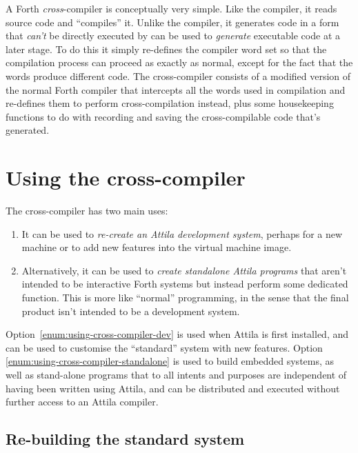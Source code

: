 A Forth \emph{cross}-compiler is conceptually very simple. Like the
compiler, it reads source code and ``compiles'' it. Unlike the
compiler, it generates code in a form that \emph{can't} be directly
executed by can be used to \emph{generate} executable code at a later
stage. To do this it simply re-defines the compiler word set so that
the compilation process can proceed as exactly as normal, except for
the fact that the words produce different code. The cross-compiler
consists of a modified version of the normal Forth compiler that
intercepts all the words used in compilation and re-defines them to
perform cross-compilation instead, plus some housekeeping functions to
do with recording and saving the cross-compilable code that's generated. 


\section{Using the cross-compiler}
\label{sec:using-cross-compiler}

The cross-compiler has two main uses:

\begin{enumerate}
\item\label{enum:using-cross-compiler-dev} It can be used to
  \emph{re-create an Attila development system}, perhaps for a new
  machine or to add new features into the virtual machine image.
\item\label{enum:using-cross-compiler-standalone} Alternatively, it
  can be used to \emph{create standalone Attila programs} that aren't
  intended to be interactive Forth systems but instead perform some
  dedicated function. This is more like ``normal'' programming, in the
  sense that the final product isn't intended to be a development
  system.
\end{enumerate}

Option~\ref{enum:using-cross-compiler-dev} is used when Attila is
first installed, and can be used to customise the ``standard'' system
with new features. Option \ref{enum:using-cross-compiler-standalone}
is used to build embedded systems, as well as stand-alone programs
that to all intents and purposes are independent of having been
written using Attila, and can be distributed and executed without
further access to an Attila compiler. 

\subsection{Re-building the standard system}
\label{sec:cross-compiler-rebuilding}



